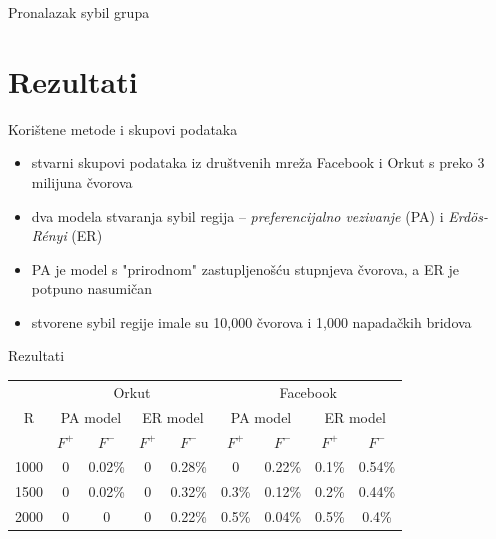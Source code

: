 \documentclass{beamer}
\begin{document}
\begin{frame}{Pronalazak sybil grupa}
  \begin{itemize}
  \end{itemize}
\end{frame}

\section{Rezultati}

\begin{frame}{Korištene metode i skupovi podataka}
  \begin{itemize}
    \item stvarni skupovi podataka iz društvenih mreža Facebook i Orkut s preko 3 milijuna čvorova
    \item dva modela stvaranja sybil regija -- \textit{preferencijalno vezivanje} (PA) i \textit{Erdös-Rényi} (ER)
    \item PA je model s "prirodnom" zastupljenošću stupnjeva čvorova, a ER je potpuno nasumičan
    \item stvorene sybil regije imale su 10,000 čvorova i 1,000 napadačkih bridova
  \end{itemize}
\end{frame}

\begin{frame}{Rezultati}
  \begin{table}
    \centering
    \begin{tabular}{|c|c|c|c|c|c|c|c|c|} \hline
      \multirow{3}{*}{R} & \multicolumn{4}{c|}{Orkut} & \multicolumn{4}{c|}{Facebook} \\
      & \multicolumn{2}{c}{PA model} & \multicolumn{2}{c|}{ER model} & \multicolumn{2}{c}{PA model} & \multicolumn{2}{c|}{ER model} \\
      & \multicolumn{1}{c}{$F^+$} & \multicolumn{1}{c}{$F^-$} & \multicolumn{1}{c}{$F^+$} & \multicolumn{1}{c|}{$F^-$} & \multicolumn{1}{c}{$F^+$} & \multicolumn{1}{c}{$F^-$} & \multicolumn{1}{c}{$F^+$} & \multicolumn{1}{c|}{$F^-$} \\ \hline
      1000 & 0 & 0.02\% & 0 & 0.28\% & 0 & 0.22\% & 0.1\% & 0.54\% \\
      1500 & 0 & 0.02\% & 0 & 0.32\% & 0.3\% & 0.12\% & 0.2\% & 0.44\% \\
      2000 & 0 & 0 & 0 & 0.22\% & 0.5\% & 0.04\% & 0.5\% & 0.4\% \\
      \hline
    \end{tabular}
  \end{table}
\end{frame}
\end{document}
